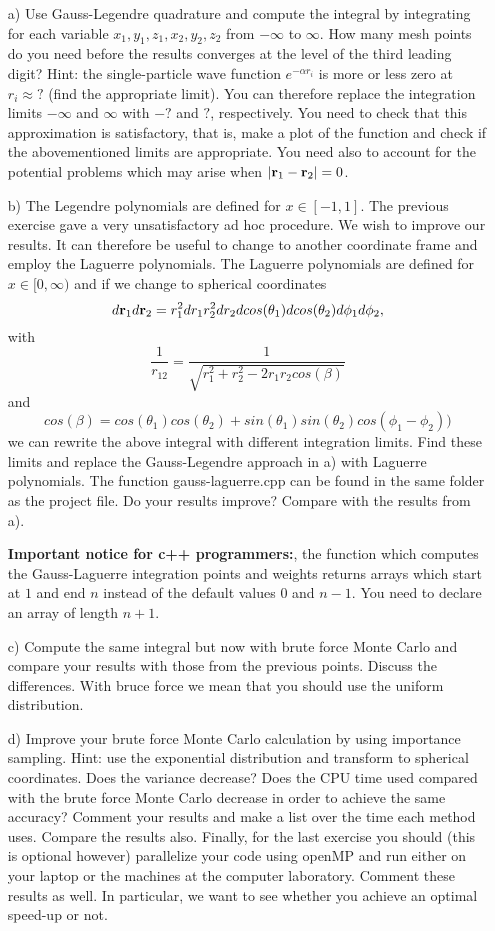 \documentclass[11pt,a4wide]{article}
\begin{document}
\begin{enumerate}
\item[a)] Use Gauss-Legendre quadrature and compute the integral by integrating 
for each variable $x_1,y_1,z_1,x_2,y_2,z_2$ from $-\infty$ to $\infty$.
How many mesh points do you need before the results converges at the level of the third 
leading digit?  Hint:  the single-particle wave function $e^{-\alpha r_i}$  is more or less zero at
$r_i \approx ?$ (find the appropriate limit).  
You can therefore replace the integration limits $-\infty$ and $\infty$ with 
$-?$ and $?$, respectively.  You need to check that this approximation is satisfactory, that is, make a plot
of the function and check if the abovementioned limits are appropriate.
You need also to account for the potential problems which may arise when $|{\bf r}_1-{\bf r}_2|=0$.
\item[b)]   The Legendre polynomials are defined for $x\in [-1,1]$. The previous exercise gave a very unsatisfactory ad hoc procedure. We wish to improve our results. It can therefore be useful to change to another coordinate
frame
and employ the Laguerre polynomials. The Laguerre polynomials are defined for $x\in [0,\infty)$ and if we change
to spherical coordinates
\[
   d{\bf r}_1d{\bf r}_2  = r_1^2dr_1 r_2^2dr_2 dcos(\theta_1)dcos(\theta_2)d\phi_1d\phi_2,
\]
with
\[
   \frac{1}{r_{12}}= \frac{1}{\sqrt{r_1^2+r_2^2-2r_1r_2cos(\beta)}}
\]
and 
\[
cos(\beta) = cos(\theta_1)cos(\theta_2)+sin(\theta_1)sin(\theta_2)cos(\phi_1-\phi_2))
\]
we can rewrite the above integral with different integration limits. Find these limits and replace the Gauss-Legendre 
approach in a) with Laguerre polynomials.  The function gauss-laguerre.cpp can be found in the same folder as the project file.
Do your results improve? Compare with the results from a).

{\bf Important notice for c++ programmers:}, the function which computes the Gauss-Laguerre integration points and weights returns arrays which start at $1$ and end $n$ instead of the default values $0$ and $n-1$. You need to declare an array of length $n+1$. 

\item[c)] Compute the same integral but now with brute force Monte Carlo
and compare your results with those from the previous points. Discuss the differences.
With bruce force we mean that you should use the uniform distribution.
\item[d)] Improve your brute force Monte Carlo calculation by using importance sampling.
Hint: use the exponential distribution and transform to spherical coordinates.
Does the variance decrease? Does the CPU time used compared with the brute force 
Monte Carlo decrease in order to achieve the same accuracy? Comment your results
and make a list over the time each method uses. Compare the results also.
Finally, for the last exercise you should (this is optional however) 
parallelize your code using openMP and run either on your laptop or the machines at the computer laboratory. Comment these results as well. In particular, we want to see whether you achieve an optimal speed-up or not.
\end{enumerate}
\end{document}
